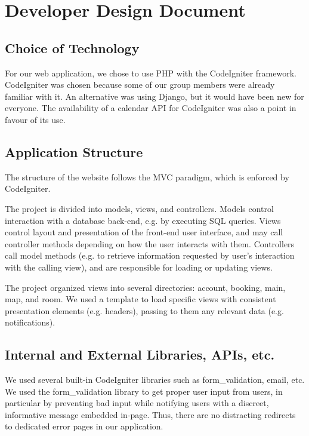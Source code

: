\documentclass[12pt]{article}
\begin{document}
\section{Developer Design Document}


\subsection{Choice of Technology}

For our web application, we chose to use PHP with the CodeIgniter framework. CodeIgniter was chosen because some of our group members were already familiar with it. An alternative was using Django, but it would have been new for everyone. The availability of a calendar API for CodeIgniter was also a point in favour of its use.


\subsection{Application Structure}

The structure of the website follows the MVC paradigm, which is enforced by CodeIgniter.

The project is divided into models, views, and controllers. Models control interaction with a database back-end, e.g. by executing SQL queries. Views control layout and presentation of the front-end user interface, and may call controller methods depending on how the user interacts with them. Controllers call model methods (e.g. to retrieve information requested by user's interaction with the calling view), and are responsible for loading or updating views.

The project organized views into several directories: account, booking, main, map, and room. We used a template to load specific views with consistent presentation elements (e.g. headers), passing to them any relevant data (e.g. notifications).


\subsection{Internal and External Libraries, APIs, etc.}

We used several built-in CodeIgniter libraries such as form\_validation, email, etc. We used the form\_validation library to get proper user input from users, in particular by preventing bad input while notifying users with a discreet, informative message embedded in-page. Thus, there are no distracting redirects to dedicated error pages in our application.
\end{document}
